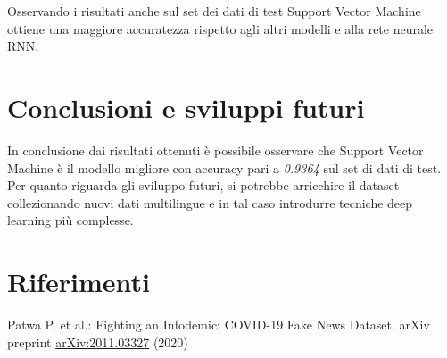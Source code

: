 \documentclass{article}
\begin{document}
\noindent
Osservando i risultati anche sul set dei dati di test Support Vector Machine ottiene una maggiore accuratezza rispetto agli altri modelli e alla rete neurale RNN.

\newpage
\section{Conclusioni e sviluppi futuri}
In conclusione dai risultati ottenuti è possibile osservare che Support Vector Machine è il modello migliore con accuracy pari a \textit{0.9364} sul set di dati di test. Per quanto riguarda gli sviluppo futuri, si potrebbe arricchire il dataset collezionando nuovi dati multilingue e in tal caso introdurre tecniche deep learning più complesse.




\section{Riferimenti}
Patwa P. et al.: Fighting an Infodemic: COVID-19 Fake News Dataset. arXiv\\
preprint \href{https://arxiv.org/abs/2011.03327}{arXiv:2011.03327} (2020)
\end{document}
